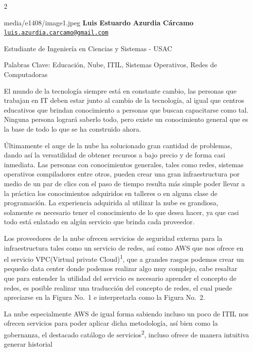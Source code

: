 \documentclass[12pt,spanish,Letterpaper,openany]{book}
\let\BeginKnitrBlock\begin \let\EndKnitrBlock\end
\begin{document}
\begin {multicols}{2}

\BeginKnitrBlock{photobiography3}{media/e1408/image1.jpeg}
\textbf{Luis Estuardo Azurdia Cárcamo}\\
\href{mailto:luis.azurdia.carcamo@gmail.com}{\nolinkurl{luis.azurdia.carcamo@gmail.com}}

\medskip

Estudiante de Ingeniería en Ciencias y Sistemas - USAC\\

\medskip

Palabras Clave: Educación, Nube, ITIL, Sistemas Operativos, Redes de Computadoras
\EndKnitrBlock{photobiography3}

El mundo de la tecnología siempre está en constante cambio, las personas que trabajan en IT deben estar junto al cambio de la tecnología, al igual que centros educativos que brindan conocimiento a personas que buscan capacitarse como tal. Ninguna persona logrará saberlo todo, pero existe un conocimiento general que es la base de todo lo que se ha construido ahora.

Últimamente el auge de la nube ha solucionado gran cantidad de problemas, dando así la versatilidad de obtener recursos a bajo precio y de forma casi inmediata. Las personas con conocimientos generales, tales como redes, sistemas operativos compiladores entre otros, pueden crear una gran infraestructura por medio de un par de clics con el paso de tiempo resulta más simple poder llevar a la práctica los conocimientos adquiridos en talleres o en alguna clase de programación. La experiencia adquirida al utilizar la nube es grandiosa, solamente es necesario tener el conocimiento de lo que desea hacer, ya que casi todo está enlatado en algún servicio que brinda cada proveedor.

Los proveedores de la nube ofrecen servicios de seguridad externa para la infraestructura tales como un servicio de redes, así como AWS que nos ofrece en el servicio VPC(Virtual private Cloud)\textsuperscript{1}, que a grandes rasgos podemos crear un pequeño data center donde podemos realizar algo muy complejo, cabe resaltar que para entender la utilidad del servicio es necesario aprender el concepto de redes, es posible realizar una traducción del concepto de redes, el cual puede apreciarse en la Figura No.~1 e interpretarla como la Figura No.~2.

La nube especialmente AWS de igual forma sabiendo incluso un poco de ITIL nos ofrecen servicios para poder aplicar dicha metodología, así bien como la gobernanza, el destacado catálogo de servicios\textsuperscript{2}, incluso ofrece de manera intuitiva generar historial


\end{multicols}
\end{document}
